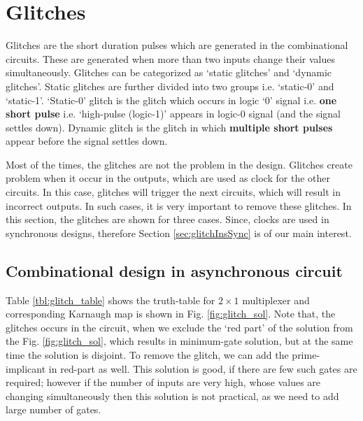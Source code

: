 



\section{Glitches} \label{sec:glitches}
Glitches are the short duration pulses which are generated in the combinational circuits. These are generated when more than two inputs change their values simultaneously. Glitches can be categorized as `static glitches' and `dynamic glitches'. Static glitches are further divided into two groups i.e. `static-0' and `static-1'. `Static-0' glitch is the glitch which occurs in logic `0' signal i.e. \textbf{one short pulse} i.e. `high-pulse (logic-1)' appears in logic-0 signal (and the signal settles down). Dynamic glitch is the glitch in which \textbf{multiple short pulses} appear before the signal settles down. 

\begin{noNumBox}
	Most of the times, the glitches are not the problem in the design. Glitches create problem when it occur in the outputs, which are used as clock for the other circuits. In this case, glitches will trigger the next circuits, which will result in incorrect outputs. In such cases, it is very important to remove these glitches. In this section, the glitches are shown for three cases. Since, clocks are used in synchronous designs, therefore Section \ref{sec:glitchInsSync} is of our main interest.
\end{noNumBox} 

\subsection{Combinational design in asynchronous circuit}
Table \ref{tbl:glitch_table} shows the truth-table for $2 \times 1$ multiplexer and corresponding Karnaugh map is shown in Fig. \ref{fig:glitch_sol}. Note that, the glitches occurs in the circuit, when we exclude the `red part' of the solution from the Fig. \ref{fig:glitch_sol}, which results in minimum-gate solution, but at the same time the solution is disjoint. To remove the glitch, we can add the prime-implicant in red-part as well. This solution is good, if there are few such gates are required; however if the number of inputs are very high, whose values are changing simultaneously then this solution is not practical, as we need to add large number of gates.

